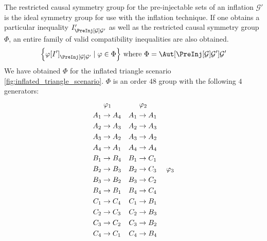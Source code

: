 \documentclass[aps, 10pt, english, twoside, pra, nofootinbib, longbibliography]{revtex4-1}
\theoremstyle{plain}
\theoremstyle{definition}
\theoremstyle{remark}
\newcommand{\graph}{\mathcal{G}}
\newcommand{\gep}{\varphi}
\newcommand{\gp}{\Phi}
\begin{document}
    The restricted causal symmetry group for the pre-injectable sets of an inflation $\graph'$ is the ideal symmetry group for use with the inflation technique. If one obtains a particular inequality $I'_{\PreInj[\graph]{\graph'}}$ as well as the restricted causal symmetry group $\gp$, an entire family of valid compatibility inequalities are also obtained.
    \[ \bc{\gep\bs{I'}_{\PreInj[\graph]{\graph'}} \mid \gep \in \gp} \text{ where } \gp = \Aut[\PreInj[\graph]{\graph'}]{\graph'} \]
    We have obtained $\gp$ for the inflated triangle scenario \cref{fig:inflated_triangle_scenario}. $\gp$ is an order $48$ group with the following $4$ generators:
    \begin{equation*}
    \begin{aligned}[c]
    &\hspace{1mm}\gep_1 \\
    A_1 &\to A_4 \\A_2 &\to A_3 \\A_3 &\to A_2 \\A_4 &\to A_1 \\B_1 &\to B_4 \\B_2 &\to B_3 \\B_3 &\to B_2 \\B_4 &\to B_1 \\C_1 &\to C_4 \\C_2 &\to C_3 \\C_3 &\to C_2 \\C_4 &\to C_1
    \end{aligned}
    \quad
    \begin{aligned}[c]
    &\hspace{1mm}\gep_2 \\
    A_1 &\to A_1 \\A_2 &\to A_3 \\A_3 &\to A_2 \\A_4 &\to A_4 \\B_1 &\to C_1 \\B_2 &\to C_3 \\B_3 &\to C_2 \\B_4 &\to C_4 \\C_1 &\to B_1 \\C_2 &\to B_3 \\C_3 &\to B_2 \\C_4 &\to B_4
    \end{aligned}
    \quad
    \begin{aligned}[c]
    &\hspace{1mm}\gep_3 \\

\end{aligned}
\end{equation*}
\end{document}
